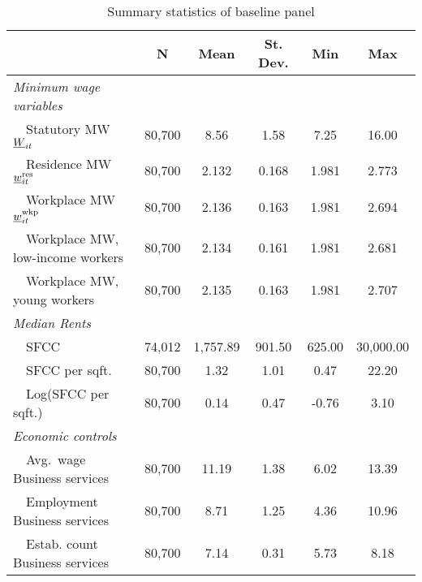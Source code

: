 \begin{table}[hbt!] \centering
    \caption{Summary statistics of baseline panel}
    \label{tab:stats_est_panel}
    \begin{tabular}{@{}lccccc@{}}
        \toprule
                                          & \multicolumn{1}{c}{N} 
                                          & \multicolumn{1}{c}{Mean} 
                                          & \multicolumn{1}{c}{St. Dev.} 
                                          & \multicolumn{1}{c}{Min} 
                                          & \multicolumn{1}{c}{Max}                 \\ \midrule
        \textit{Minimum wage variables}               &       &       &       &       &       \\
        $\quad$Statutory MW $\underline{W}_{it}$                & 80,700  & 8.56  & 1.58  & 7.25  & 16.00  \\
        $\quad$Residence MW $\underline{w}^{\text{res}}_{it}$         & 80,700  & 2.132  & 0.168  & 1.981  & 2.773  \\
        $\quad$Workplace MW $\underline{w}^{\text{wkp}}_{it}$         & 80,700  & 2.136  & 0.163  & 1.981  & 2.694  \\
        $\quad$Workplace MW, low-income workers       & 80,700  & 2.134  & 0.161  & 1.981  & 2.681  \\
        $\quad$Workplace MW, young workers            & 80,700  & 2.135  & 0.163  & 1.981  & 2.707  \\[.3em]
        \textit{Median Rents}                         &       &       &       &       &       \\
        $\quad$SFCC                                   & 74,012  & 1,757.89  & 901.50  & 625.00  & 30,000.00  \\
        $\quad$SFCC per sqft.                         & 80,700  & 1.32  & 1.01  & 0.47  & 22.20  \\
        $\quad$Log(SFCC per sqft.)                    & 80,700  & 0.14  & 0.47  & -0.76  & 3.10  \\[.3em]
        \textit{Economic controls}                    &       &       &       &       &       \\
        $\quad$Avg.\ wage Business services           & 80,700  & 11.19  & 1.38  & 6.02  & 13.39  \\
        $\quad$Employment Business services           & 80,700  & 8.71  & 1.25  & 4.36  & 10.96  \\
        $\quad$Estab. count Business services         & 80,700  & 7.14  & 0.31  & 5.73  & 8.18  \\

\end{tabular}
\end{table}
